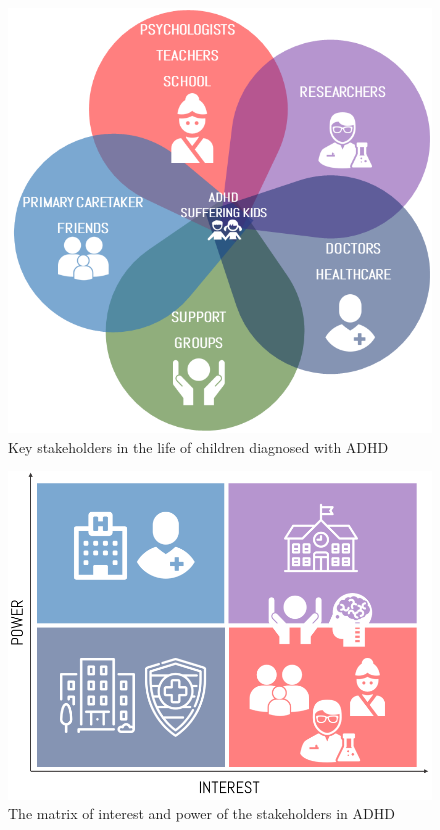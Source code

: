 \documentclass[letterpaper,10pt]{article}
\begin{document}
\begin{figure}[!htb]
\centering
\includegraphics[scale=0.5]{stateholderscircle.png}
\caption{Key stakeholders in the life of children diagnosed with ADHD}
\label{img:adhd:stakeholders}
\end{figure}

\begin{figure}[!htb]
\centering
\includegraphics[scale=0.5]{interest.png}
\caption{The matrix of interest and power of the stakeholders in ADHD}
\label{img:stakeholders_level_of_int}
\end{figure}
\end{document}
